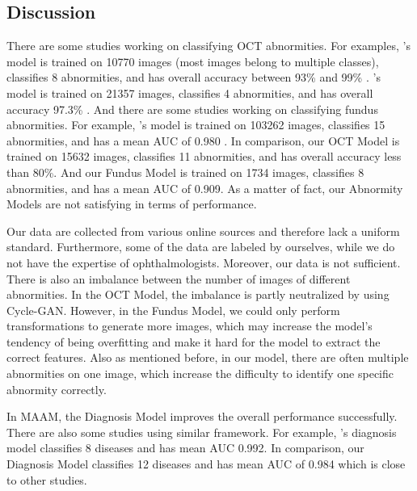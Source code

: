 \documentclass{article}
\begin{document}
	\begin{multicols}{2}
	\section{Discussion}
	
	There are some studies working on classifying OCT abnormities.  For examples, \citeauthor{leandro2023oct}'s model is trained on 10770 images (most images belong to multiple classes), classifies 8 abnormities, and has overall accuracy between 93\% and 99\% \autocite{leandro2023oct}. \citeauthor{li2019deep}'s model is trained on 21357 images, classifies 4 abnormities, and has overall accuracy 97.3\% \autocite{li2019deep}.  And there are some studies working on classifying fundus abnormities.  For example,  	\citeauthor{Son2023}'s model is trained on 103262 images, classifies 15 abnormities, and has a mean AUC of 0.980 \autocite{Son2023}. In comparison, our OCT Model is trained on 15632 images, classifies 11 abnormities, and has overall accuracy less than 80\%.  And our Fundus Model is trained on 1734 images, classifies 8 abnormities, and has a mean AUC of 0.909. As a matter of fact, our Abnormity Models are not satisfying in terms of performance.
	
	Our data are collected from various online sources and therefore lack a uniform standard. Furthermore, some of the data are labeled by ourselves, while we do not have the expertise of ophthalmologists. Moreover, our data is not sufficient. There is also an imbalance between the number of images of different abnormities. In the OCT Model, the imbalance is partly neutralized by using Cycle-GAN. However, in the Fundus Model, we could only perform transformations to generate more images, which may increase the model's tendency of being overfitting and make it hard for the model to extract the correct features. Also as mentioned before, in our model, there are often multiple abnormities on one image, which increase the difficulty to identify one specific abnormity correctly. 
	
	\vspace{0.3cm}
	
	In MAAM, the Diagnosis Model improves the overall performance successfully. There are also some studies using similar framework. For example, \citeauthor{Son2023}'s diagnosis model classifies 8 diseases and has mean AUC 0.992\autocite{Son2023}. In comparison, our Diagnosis Model classifies 12 diseases and has mean AUC of 0.984 which is close to other studies.
	

\end{multicols}
\end{document}
